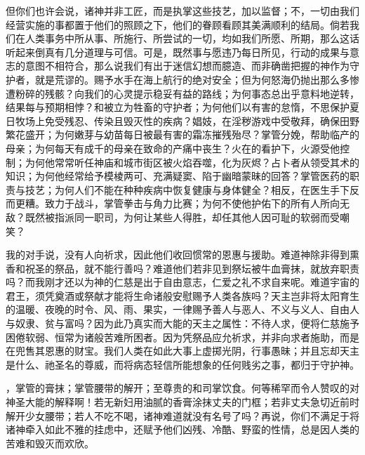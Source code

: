 但你们也许会说，诸神并非工匠，而是执掌这些技艺，加以监督；不，一切由我们经营实施的事都置于他们的照顾之下，他们的眷顾看顾其美满顺利的结局。倘若我们在人类事务中所从事、所施行、所尝试的一切，均如我们所愿、所期，那么这话听起来倒真有几分道理与可信。可是，既然事与愿违乃每日所见，行动的成果与意志的意图不相符合，那么说我们有出于迷信幻想而臆造、而非确凿把握的神作为守护者，就是荒谬的。赐予水手在海上航行的绝对安全；但为何怒海仍抛出那么多惨遭粉碎的残骸？向我们的心灵提示稳妥有益的路线；为何事态总出乎意料地逆转，结果每与预期相悖？和被立为牲畜的守护者；为何他们以有害的怠惰，不思保护夏日牧场上免受残忍、传染且毁灭性的疾病？娼妓，在淫秽游戏中受敬拜，确保田野繁花盛开；为何嫩芽与幼苗每日被最有害的霜冻摧残殆尽？掌管分娩，帮助临产的母亲；为何每天有成千的母亲在致命的产痛中丧生？火在的看护下，火源受他控制；为何他常常听任神庙和城市街区被火焰吞噬，化为灰烬？占卜者从领受其术的知识；为何他经常给予模棱两可、充满疑窦、陷于幽暗蒙昧的回答？掌管医药的职责与技艺；为何人们不能在种种疾病中恢复健康与身体健全？相反，在医生手下反而更糟。致力于战斗，掌管拳击与角力比赛；为何不使他护佑下的所有人所向无敌？既然被指派同一职司，为何让某些人得胜，却任其他人因可耻的软弱而受嘲笑？\par

我的对手说，没有人向祈求，因此他们收回惯常的恩惠与援助。难道神除非得到熏香和祝圣的祭品，就不能行善吗？难道他们若非见到祭坛被牛血膏抹，就放弃职责吗？而我刚才还以为神的仁慈是出于自由意志，仁爱之礼不求自来呢。难道宇宙的君王，须凭奠酒或祭献才能将生命诸般安慰赐予人类各族吗？天主岂非将太阳育生的温暖、夜晚的时令、风、雨、果实，一律赐予善人与恶人、不义与义人、自由人与奴隶、贫与富吗？因为此乃真实而大能的天主之属性：不待人求，便将仁慈施予困倦软弱、恒常为诸般苦难所困者。因为凭祭品应允祈求，并非向求者施助，而是在兜售其恩惠的财宝。我们人类在如此大事上虚掷光阴，行事愚昧；并且忘却天主是什么、祂圣名的尊威，而将病态轻信所能想象的任何贱劣之事，都归于守护神。\par

，掌管的膏抹；掌管腰带的解开；至尊贵的和司掌饮食。何等稀罕而令人赞叹的对神圣大能的解释啊！若无新妇用油腻的香膏涂抹丈夫的门框；若非丈夫急切近前时解开少女腰带；若人不吃不喝，诸神难道就没有名号了吗？再说，你们不满足于将诸神牵入如此不雅的挂虑中，还赋予他们凶残、冷酷、野蛮的性情，总是因人类的苦难和毁灭而欢欣。\par

